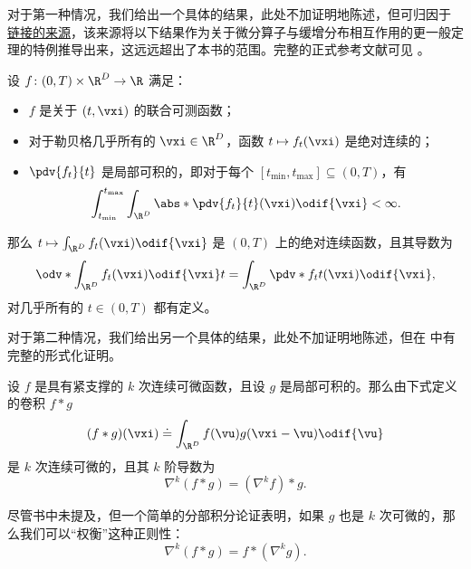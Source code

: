 \documentclass[../../book-main_zh.tex]{subfiles}
\begin{document}
对于第一种情况，我们给出一个具体的结果，此处不加证明地陈述，但可归因于 \href{https://planetmath.org/differentiationundertheintegralsign}{链接的来源}，该来源将以下结果作为关于微分算子与缓增分布相互作用的更一般定理的特例推导出来，这远远超出了本书的范围。完整的正式参考文献可见 \cite{jones1982theory}。
\begin{proposition}\label{prop:dutis}
    设 \(f \colon (0, T) \times \R^{D} \to \R\) 满足：
    \begin{itemize}
        \item \(f\) 是关于 \((t, \vxi)\) 的联合可测函数；
        \item 对于勒贝格几乎所有的 \(\vxi \in \R^{D}\)，函数 \(t \mapsto f_{t}(\vxi)\) 是绝对连续的；
        \item \(\pdv{f_{t}}{t}\) 是局部可积的，即对于每个 \([t_{\min}, t_{\max}] \subseteq (0, T)\)，有
            \begin{equation}
                \int_{t_{\min}}^{t_{\max}}\int_{\R^{D}}\abs*{\pdv{f_{t}}{t}(\vxi)}\odif{\vxi}
                < \infty.
            \end{equation}
    \end{itemize}
    那么 \(t \mapsto \int_{\R^{D}}f_{t}(\vxi)\odif{\vxi}\) 是 \((0, T)\) 上的绝对连续函数，且其导数为
    \begin{equation}
        \odv*{\int_{\R^{D}}f_{t}(\vxi)\odif{\vxi}}{t} =
        \int_{\R^{D}}\pdv*{f_{t}}{t}(\vxi)\odif{\vxi},
    \end{equation}
    对几乎所有的 \(t \in (0, T)\) 都有定义。
\end{proposition}

对于第二种情况，我们给出另一个具体的结果，此处不加证明地陈述，但在 \cite{brezis2011functional} 中有完整的形式化证明。
\begin{proposition}\label{prop:diff_convolution}
    设 \(f\) 是具有紧支撑的 \(k\) 次连续可微函数，且设 \(g\) 是局部可积的。那么由下式定义的卷积 \(f * g\)
    \begin{equation}
        (f * g)(\vxi) \doteq \int_{\R^{D}}f(\vu)g(\vxi - \vu)\odif{\vu}
    \end{equation}
    是 \(k\) 次连续可微的，且其 \(k\) 阶导数为
    \begin{equation}
        \nabla^{k}(f * g) =(\nabla^{k}f) * g.
    \end{equation}
\end{proposition}
尽管书中未提及，但一个简单的分部积分论证表明，如果 \(g\) 也是 \(k\) 次可微的，那么我们可以“权衡”这种正则性：
\begin{equation}
    \nabla^{k}(f * g) = f * (\nabla^{k} g).
\end{equation}
\end{document}

